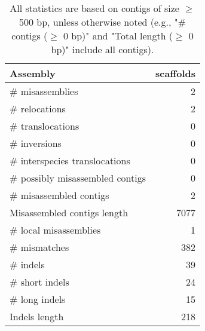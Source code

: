 \documentclass[12pt,a4paper]{article}
\begin{document}
\begin{table}[ht]
\begin{center}
\caption{All statistics are based on contigs of size $\geq$ 500 bp, unless otherwise noted (e.g., "\# contigs ($\geq$ 0 bp)" and "Total length ($\geq$ 0 bp)" include all contigs).}
\begin{tabular}{|l*{1}{|r}|}
\hline
Assembly & scaffolds \\ \hline
\# misassemblies & 2 \\ \hline
\hspace{5mm}\# relocations & 2 \\ \hline
\hspace{5mm}\# translocations & 0 \\ \hline
\hspace{5mm}\# inversions & 0 \\ \hline
\hspace{5mm}\# interspecies translocations & 0 \\ \hline
\# possibly misassembled contigs & 0 \\ \hline
\# misassembled contigs & 2 \\ \hline
Misassembled contigs length & 7077 \\ \hline
\# local misassemblies & 1 \\ \hline
\# mismatches & 382 \\ \hline
\# indels & 39 \\ \hline
\hspace{5mm}\# short indels & 24 \\ \hline
\hspace{5mm}\# long indels & 15 \\ \hline
Indels length & 218 \\ \hline
\end{tabular}
\end{center}
\end{table}
\end{document}
